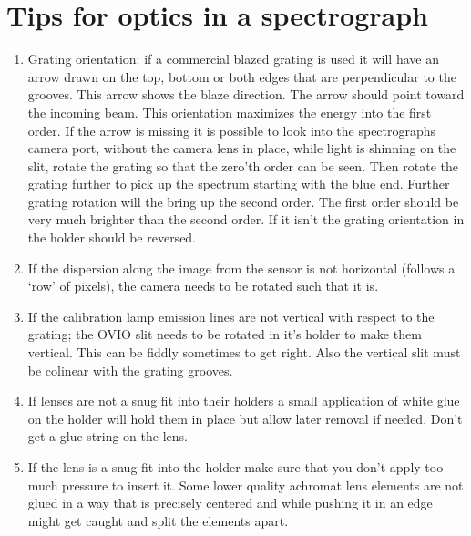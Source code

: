 \documentclass[letterpaper,10pt,english,openany,oneside]{sphinxmanual}
\begin{document}
\section{Tips for optics in a spectrograph}
\label{\detokenize{optics:tips-for-optics-in-a-spectrograph}}\begin{enumerate}
%
\item {} 
\sphinxAtStartPar
Grating orientation: if a commercial blazed grating is used it
will have an arrow drawn on the top, bottom or both edges that are
perpendicular to the grooves.  This arrow shows the blaze
direction. The arrow should point toward the incoming beam.  This
orientation maximizes the energy into the first order. If the
arrow is missing it is possible to look into the spectrographs
camera port, without the camera lens in place, while light is
shinning on the slit, rotate the grating so that the zero’th order
can be seen. Then rotate the grating further to pick up the
spectrum starting with the blue end. Further grating rotation will
the bring up the second order. The first order should be very much
brighter than the second order.  If it isn’t the grating
orientation in the holder should be reversed.

\item {} 
\sphinxAtStartPar
If the dispersion along the image from the sensor is not
horizontal (follows a ‘row’ of pixels), the camera needs to be
rotated such that it is.

\item {} 
\sphinxAtStartPar
If the calibration lamp emission lines are not vertical with
respect to the grating; the OVIO slit needs to be rotated in it’s
holder to make them vertical. This can be fiddly sometimes to get
right. Also the vertical slit must be co\sphinxhyphen{}linear with the grating
grooves.

\item {} 
\sphinxAtStartPar
If lenses are not a snug fit into their holders a small
application of white glue on the holder will hold them in place
but allow later removal if needed. Don’t get a glue string on the
lens.

\item {} 
\sphinxAtStartPar
If the lens is a snug fit into the holder make sure that you don’t
apply too much pressure to insert it. Some lower quality achromat
lens elements are not glued in a way that is precisely centered
and while pushing it in an edge might get caught and split the
elements apart.


\end{enumerate}
\end{document}
